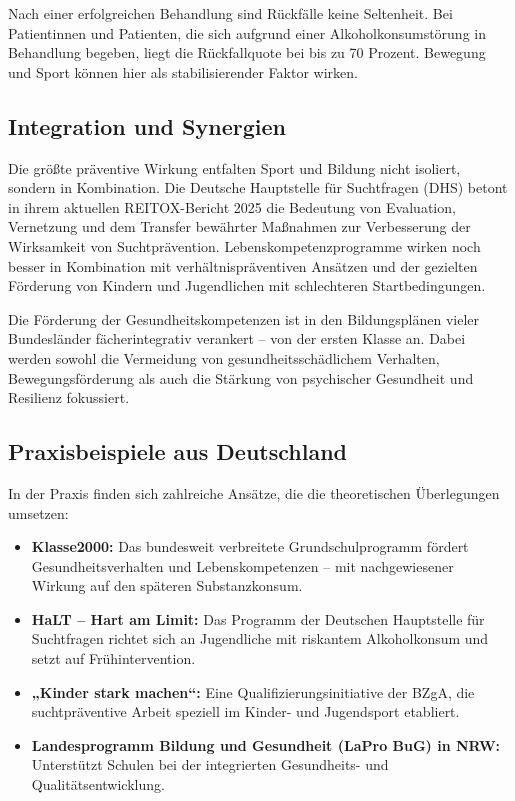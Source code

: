 \documentclass[11pt,a4paper]{article}
\begin{document}
	Nach einer erfolgreichen Behandlung sind Rückfälle keine Seltenheit. Bei Patientinnen und Patienten, die sich aufgrund einer Alkoholkonsumstörung in Behandlung begeben, liegt die Rückfallquote bei bis zu 70 Prozent. Bewegung und Sport können hier als stabilisierender Faktor wirken\cite{sport-therapy}.
	
	\subsection{Integration und Synergien}
	
	Die größte präventive Wirkung entfalten Sport und Bildung nicht isoliert, sondern in Kombination. Die Deutsche Hauptstelle für Suchtfragen (DHS) betont in ihrem aktuellen REITOX-Bericht 2025 die Bedeutung von Evaluation, Vernetzung und dem Transfer bewährter Maßnahmen zur Verbesserung der Wirksamkeit von Suchtprävention\cite{dhs-reitox-2025}. Lebenskompetenzprogramme wirken noch besser in Kombination mit verhältnispräventiven Ansätzen und der gezielten Förderung von Kindern und Jugendlichen mit schlechteren Startbedingungen\cite{life-skills-evaluation}.
	
	Die Förderung der Gesundheitskompetenzen ist in den Bildungsplänen vieler Bundesländer fächerintegrativ verankert – von der ersten Klasse an. Dabei werden sowohl die Vermeidung von gesundheitsschädlichem Verhalten, Bewegungsförderung als auch die Stärkung von psychischer Gesundheit und Resilienz fokussiert\cite{health-literacy-schools}.
	
	\subsection{Praxisbeispiele aus Deutschland}
	
	In der Praxis finden sich zahlreiche Ansätze, die die theoretischen Überlegungen umsetzen:
	
	\begin{itemize}[leftmargin=*, noitemsep]
		\item \textbf{Klasse2000:} Das bundesweit verbreitete Grundschulprogramm fördert Gesundheitsverhalten und Lebenskompetenzen – mit nachgewiesener Wirkung auf den späteren Substanzkonsum.
		\item \textbf{HaLT – Hart am Limit:} Das Programm der Deutschen Hauptstelle für Suchtfragen richtet sich an Jugendliche mit riskantem Alkoholkonsum und setzt auf Frühintervention.
		\item \textbf{„Kinder stark machen“:} Eine Qualifizierungsinitiative der BZgA, die suchtpräventive Arbeit speziell im Kinder- und Jugendsport etabliert.
		\item \textbf{Landesprogramm Bildung und Gesundheit (LaPro BuG) in NRW:} Unterstützt Schulen bei der integrierten Gesundheits- und Qualitätsentwicklung\cite{school-prevention}.
	\end{itemize}
	
\end{document}
